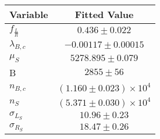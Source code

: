 \begin{tabular}[t]{lc}
\hline
Variable &Fitted Value\\
\hline\hline
$f_{\frac{L}{R}}$&$0.436\pm0.022$\\
\hline
$\lambda_{B,c}$&$-0.00117\pm0.00015$\\
\hline
$\mu_S$&$5278.895\pm0.079$\\
\hline
B&$2855\pm56$\\
\hline
$n_{B,c}$&$(1.160\pm0.023)\times 10^4$\\
\hline
$n_S$&$(5.371\pm0.030)\times 10^4$\\
\hline
$\sigma_{L_S}$&$10.96\pm0.23$\\
\hline
$\sigma_{R_S}$&$18.47\pm0.26$\\
\hline
\end{tabular}